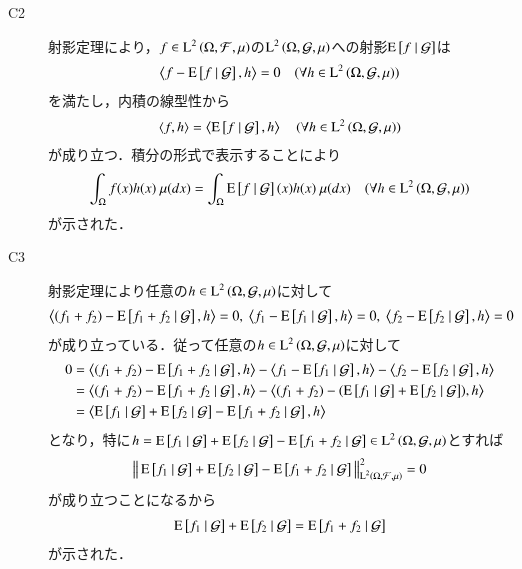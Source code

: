 \begin{prf}
\begin{description}
			\item[C2] 
				射影定理により，$f \in \operatorname{L}^{2} \left(\Omega, \mathcal{F},\mu\right)$の$\operatorname{L}^{2} \left(\Omega, \mathcal{G},\mu\right)$への射影$\operatorname{E} \left[ f \ \middle|\ \mathcal{G} \right]$は
				\begin{align}
					\inprod<f - \cexp{f}{\mathcal{G}}, h> = 0 \quad (\forall h \in \Lp{2}{\Omega, \mathcal{G},\mu})
				\end{align}
				を満たし，内積の線型性から
				\begin{align}
					\inprod<f, h> = \inprod<\cexp{f}{\mathcal{G}}, h> \quad (\forall h \in \Lp{2}{\Omega, \mathcal{G},\mu})
				\end{align}
				が成り立つ．積分の形式で表示することにより
				\begin{align}
					\int_{\Omega} f(x)h(x)\ \mu(dx) = \int_{\Omega} \operatorname{E} \left[ f \ \middle|\ \mathcal{G} \right](x)h(x)\ \mu(dx) \quad (\forall h \in \operatorname{L}^{2} \left(\Omega, \mathcal{G},\mu\right))
				\end{align}
				が示された．
				
			\item[C3] 
				射影定理により任意の$h \in \operatorname{L}^{2} \left(\Omega, \mathcal{G},\mu\right)$に対して
				\begin{align}
					\inprod<(f_1 + f_2) - \cexp{f_1 + f_2}{\mathcal{G}}, h> = 0,\ \inprod<f_1 - \cexp{f_1}{\mathcal{G}}, h> = 0,\ \inprod<f_2 - \cexp{f_2}{\mathcal{G}}, h> = 0
				\end{align}
				が成り立っている．従って任意の$h \in \operatorname{L}^{2} \left(\Omega, \mathcal{G},\mu\right)$に対して
				\begin{align}
					0 &= \inprod<(f_1 + f_2) - \cexp{f_1 + f_2}{\mathcal{G}}, h> - \inprod<f_1 - \cexp{f_1}{\mathcal{G}}, h> - \inprod<f_2 - \cexp{f_2}{\mathcal{G}}, h> \\
					&= \inprod<(f_1 + f_2) - \cexp{f_1 + f_2}{\mathcal{G}}, h> - \inprod<(f_1 + f_2) - (\cexp{f_1}{\mathcal{G}} + \cexp{f_2}{\mathcal{G}}), h> \\
					&= \inprod<\cexp{f_1}{\mathcal{G}} + \cexp{f_2}{\mathcal{G}} - \cexp{f_1 + f_2}{\mathcal{G}}, h>
				\end{align}
				となり，特に$h = \operatorname{E} \left[ f_1 \ \middle|\ \mathcal{G} \right] + \operatorname{E} \left[ f_2 \ \middle|\ \mathcal{G} \right] - \operatorname{E} \left[ f_1 + f_2 \ \middle|\ \mathcal{G} \right] \in \operatorname{L}^{2} \left(\Omega, \mathcal{G},\mu\right)$とすれば
				\begin{align}
					\left\|\, \operatorname{E} \left[ f_1 \ \middle|\ \mathcal{G} \right] + \operatorname{E} \left[ f_2 \ \middle|\ \mathcal{G} \right] - \operatorname{E} \left[ f_1 + f_2 \ \middle|\ \mathcal{G} \right]\, \right\|_{\operatorname{L}^{2} \left(\Omega, \mathcal{F},\mu\right)}^2 = 0
				\end{align}
				が成り立つことになるから
				\begin{align}
					\operatorname{E} \left[ f_1 \ \middle|\ \mathcal{G} \right] + \operatorname{E} \left[ f_2 \ \middle|\ \mathcal{G} \right] = \operatorname{E} \left[ f_1 + f_2 \ \middle|\ \mathcal{G} \right]
				\end{align}
				が示された．
				

\end{description}
\end{prf}

